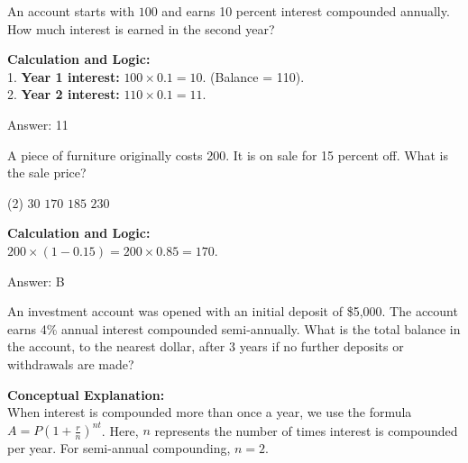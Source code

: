 \documentclass[11pt,paper=a4,answers]{exam}
\begin{document}
\begin{questions}
\vspace{60pt}

\question
An account starts with $100$ and earns 10 percent interest compounded annually. How much interest is earned in the second year?

\begin{solution}
\textbf{Calculation and Logic:} \\
1. \textbf{Year 1 interest:} $100 \times 0.1 = 10$. (Balance = 110). \\
2. \textbf{Year 2 interest:} $110 \times 0.1 = 11$.

\vspace{30pt}

Answer: \colorbox{yellow!100}{11}
\end{solution}

\vspace{60pt}

\question
A piece of furniture originally costs  200. It is on sale for 15 percent off. What is the sale price?
\begin{tasks}(2)
    \task $30$
    \task $170$
    \task $185$
    \task $230$
\end{tasks}

\begin{solution}
\textbf{Calculation and Logic:} \\
$200 \times (1 - 0.15) = 200 \times 0.85 = 170$.

\vspace{30pt}

Answer: \colorbox{yellow!100}{B}
\end{solution}


\question
An investment account was opened with an initial deposit of \$5,000. The account earns 4\% annual interest compounded semi-annually. What is the total balance in the account, to the nearest dollar, after 3 years if no further deposits or withdrawals are made?

\begin{solution}
\textbf{Conceptual Explanation:} \\
When interest is compounded more than once a year, we use the formula $A = P(1 + \frac{r}{n})^{nt}$. Here, $n$ represents the number of times interest is compounded per year. For semi-annual compounding, $n=2$.


\end{solution}
\end{questions}
\end{document}
